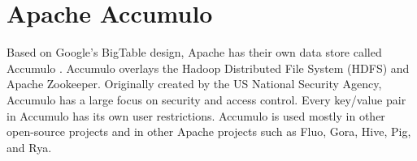 \section{Apache Accumulo}

Based on Google's BigTable design, Apache has their own
data store called Accumulo \cite{www-hid-sp18-526-apache-accumulo}.
Accumulo overlays the Hadoop Distributed File System (HDFS) and
Apache Zookeeper. Originally created by the US National Security
Agency, Accumulo has a large focus on security and access control. 
Every key/value pair in Accumulo has its own user restrictions. 
Accumulo is used mostly in other open-source projects and in other 
Apache projects such as Fluo, Gora, Hive, Pig, and Rya.

